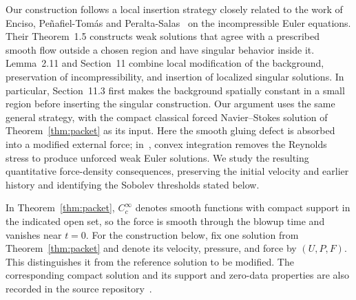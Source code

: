 Our construction follows a local insertion strategy closely related to
the work of Enciso, Pe\~nafiel-Tom\'as and Peralta-Salas~\cite{eppt2025}
on the incompressible Euler equations. Their Theorem~1.5 constructs weak
solutions that agree with a prescribed smooth flow outside a chosen region
and have singular behavior inside it. Lemma~2.11 and Section~11 combine
local modification of the background, preservation of incompressibility,
and insertion of localized singular solutions. In particular,
Section~11.3 first makes the background spatially constant in a small
region before inserting the singular construction. Our argument uses
the same general strategy, with the compact classical forced
Navier--Stokes solution of Theorem~\ref{thm:packet} as its input.
Here the smooth gluing defect is absorbed into a modified external force;
in~\cite{eppt2025}, convex integration removes the Reynolds stress to
produce unforced weak Euler solutions. We study the resulting quantitative
force-density consequences, preserving the initial velocity and earlier
history and identifying the Sobolev thresholds stated below.

In Theorem~\ref{thm:packet}, $C_c^\infty$ denotes smooth functions with compact support in the
indicated open set, so the force is smooth through the blowup time and
vanishes near $t=0$. For the construction below, fix one solution from
Theorem~\ref{thm:packet} and denote its velocity, pressure, and force by
$(U,P,F)$. This distinguishes it from the reference solution to be
modified. The corresponding compact solution and its support and
zero-data properties are also recorded in the source repository~\cite{lean}.

